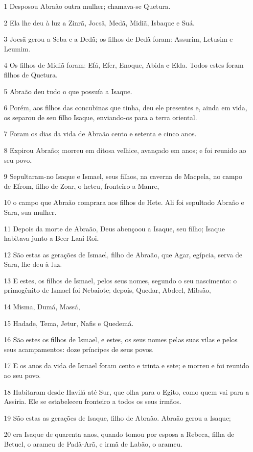 \par 1 Desposou Abraão outra mulher; chamava-se Quetura.
\par 2 Ela lhe deu à luz a Zinrã, Jocsã, Medã, Midiã, Isbaque e Suá.
\par 3 Jocsã gerou a Seba e a Dedã; os filhos de Dedã foram: Assurim, Letusim e Leumim.
\par 4 Os filhos de Midiã foram: Efá, Efer, Enoque, Abida e Elda. Todos estes foram filhos de Quetura.
\par 5 Abraão deu tudo o que possuía a Isaque.
\par 6 Porém, aos filhos das concubinas que tinha, deu ele presentes e, ainda em vida, os separou de seu filho Isaque, enviando-os para a terra oriental.
\par 7 Foram os dias da vida de Abraão cento e setenta e cinco anos.
\par 8 Expirou Abraão; morreu em ditosa velhice, avançado em anos; e foi reunido ao seu povo.
\par 9 Sepultaram-no Isaque e Ismael, seus filhos, na caverna de Macpela, no campo de Efrom, filho de Zoar, o heteu, fronteiro a Manre,
\par 10 o campo que Abraão comprara aos filhos de Hete. Ali foi sepultado Abraão e Sara, sua mulher.
\par 11 Depois da morte de Abraão, Deus abençoou a Isaque, seu filho; Isaque habitava junto a Beer-Laai-Roi.
\par 12 São estas as gerações de Ismael, filho de Abraão, que Agar, egípcia, serva de Sara, lhe deu à luz.
\par 13 E estes, os filhos de Ismael, pelos seus nomes, segundo o seu nascimento: o primogênito de Ismael foi Nebaiote; depois, Quedar, Abdeel, Mibsão,
\par 14 Misma, Dumá, Massá,
\par 15 Hadade, Tema, Jetur, Nafis e Quedemá.
\par 16 São estes os filhos de Ismael, e estes, os seus nomes pelas suas vilas e pelos seus acampamentos: doze príncipes de seus povos.
\par 17 E os anos da vida de Ismael foram cento e trinta e sete; e morreu e foi reunido ao seu povo.
\par 18 Habitaram desde Havilá até Sur, que olha para o Egito, como quem vai para a Assíria. Ele se estabeleceu fronteiro a todos os seus irmãos.
\par 19 São estas as gerações de Isaque, filho de Abraão. Abraão gerou a Isaque;
\par 20 era Isaque de quarenta anos, quando tomou por esposa a Rebeca, filha de Betuel, o arameu de Padã-Arã, e irmã de Labão, o arameu.
